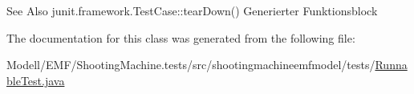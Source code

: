 \begin{DoxySeeAlso}{See Also}
junit.\-framework.\-Test\-Case\-::tear\-Down() Generierter Funktionsblock 
\end{DoxySeeAlso}


The documentation for this class was generated from the following file\-:\begin{DoxyCompactItemize}
\item 
Modell/\-E\-M\-F/\-Shooting\-Machine.\-tests/src/shootingmachineemfmodel/tests/\hyperlink{_runnable_test_8java}{Runnable\-Test.\-java}\end{DoxyCompactItemize}
